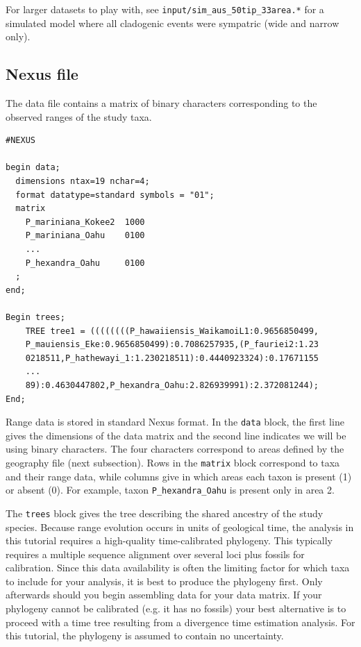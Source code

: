 For larger datasets to play with, see {\tt input/sim\_aus\_50tip\_33area.*} for a simulated model where all cladogenic events were sympatric (wide and narrow only). 

\subsection{Nexus file}

The data file contains a matrix of binary characters corresponding to the observed ranges of the study taxa.


\begin{framed}
\begin{lstlisting}
#NEXUS

begin data;
  dimensions ntax=19 nchar=4;
  format datatype=standard symbols = "01";
  matrix
    P_mariniana_Kokee2  1000
    P_mariniana_Oahu    0100
    ...
    P_hexandra_Oahu     0100
  ;
end;

Begin trees;
	TREE tree1 = ((((((((P_hawaiiensis_WaikamoiL1:0.9656850499,
	P_mauiensis_Eke:0.9656850499):0.7086257935,(P_fauriei2:1.23
	0218511,P_hathewayi_1:1.230218511):0.4440923324):0.17671155
	...
	89):0.4630447802,P_hexandra_Oahu:2.826939991):2.372081244);
End;
\end{lstlisting}
\end{framed}

Range data is stored in standard Nexus format.
In the {\tt data} block, the first line gives the dimensions of the data matrix and the second line indicates we will be using binary characters.
The four characters correspond to areas defined by the geography file (next subsection).
Rows in the {\tt matrix} block correspond to taxa and their range data, while columns give in which areas each taxon is present (1) or absent (0).
For example, taxon {\tt P\_hexandra\_Oahu} is present only in area 2.

The {\tt trees} block gives the tree describing the shared ancestry of the study species.
Because range evolution occurs in units of geological time, the analysis in this tutorial requires a high-quality time-calibrated phylogeny.
This typically requires a multiple sequence alignment over several loci plus fossils for calibration.
Since this data availability is often the limiting factor for which taxa to include for your analysis, it is best to produce the phylogeny first.
Only afterwards should you begin assembling data for your data matrix.
If your phylogeny cannot be calibrated (e.g. it has no fossils) your best alternative is to proceed with a time tree resulting from a divergence time estimation analysis.
For this tutorial, the phylogeny is assumed to contain no uncertainty.

